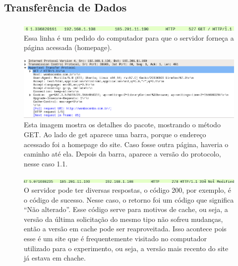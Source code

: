 \documentclass{article}
\begin{document}
\subsection{Transferência de Dados}

\begin{figure}[H]
    \centering
    \includegraphics[width=\textwidth]{images/conect6.png}
    \caption{Essa linha é um pedido do computador para que o servidor forneça a página acessada (homepage).}
    \label{fig:conect6}
\end{figure}{}

\begin{figure}[H]
    \centering
    \includegraphics[width=\textwidth]{images/conect7.png}
    \caption{Esta imagem mostra os detalhes do pacote, mostrando o método GET. Ao lado de get aparece uma barra, porque o endereço acessado foi a homepage do site. Caso fosse outra página, haveria o caminho até ela. Depois da barra, aparece a versão do protocolo, nesse caso 1.1.}
    \label{fig:conect7}
\end{figure}{}

\begin{figure}[H]
    \centering
    \includegraphics[width=\textwidth]{images/data1.png}
    \caption{O servidor pode ter diversas respostas, o código 200, por exemplo, é o código de sucesso. Nesse caso, o retorno foi um código que significa ``Não alterado''. Esse código serve para motivos de cache, ou seja, a versão da última solicitação do mesmo tipo não sofreu mudanças, então a versão em cache pode ser reaproveitada. Isso acontece pois esse é um site que é frequentemente visitado no computador utilizado para o experimento, ou seja, a versão mais recento do site já estava em chache.}
    \label{fig:data1}
\end{figure}{}
\end{document}
